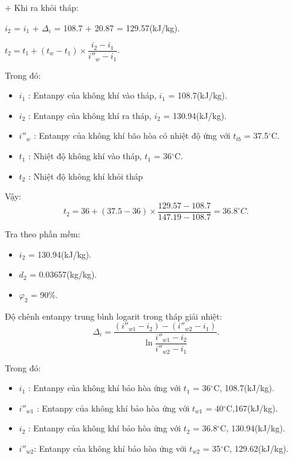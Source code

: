 \newpage
+ Khi ra khỏi tháp:

	$i_{2}$ = $i_{1}$ + $\Delta_{i}$ = 108.7 + 20.87 = 129.57(kJ/kg).
	
	$t_{2} = t_{1} + (t_{w} - t_{1}) \times \dfrac{i_{2} - i_{1}}{i''_{w} - i_{1}}$.
	
Trong đó:
\begin{itemize}
	\item $i_{1}$ : Entanpy của không khí vào tháp, $i_{1}$ = 108.7(kJ/kg).
	\item $i_{2}$ : Entanpy của không khí ra tháp, $i_{2}$ = 130.94(kJ/kg).
	\item $i''_{w}$ : Entanpy của không khí bão hòa có nhiệt độ ứng với $t_{tb}$ = 37.5$^{\circ}$C.
	\item $t_{1}$ : Nhiệt độ không khí vào tháp, $t_{1}$ = 36$^{\circ}$C.
	\item $t_{2}$ : Nhiệt độ không khí khỏi tháp
\end{itemize}
 Vậy:
 \begin{equation*}
 	t_{2} = 36 + (37.5 - 36 ) \times \dfrac{129.57 - 108.7}{147.19 - 108.7} = 36.8^{\circ}C.
 \end{equation*}

Tra theo phần mềm:
\begin{itemize}
	\item $i_{2}$ = 130.94(kJ/kg).
	\item $d_{2}$ = 0.03657(kg/kg).
	\item $\varphi_{2}$ = 90\%.
\end{itemize}

Độ chênh entanpy trung bình logarit trong tháp giải nhiệt:
\begin{equation*}
	\Delta_{i} = \dfrac{(i''_{w1} - i_{2}) - (i''_{w2} - i_{1}) }{\ln \dfrac{i''_{w1} - i_{2}}{i''_{w2} - i_{1}}}.
\end{equation*}

Trong đó:
\begin{itemize}
	\item $i_{1}$ : Entanpy của không khí bảo hòa ứng với $t_{1}$ = 36$^{\circ}$C, 108.7(kJ/kg).
	\item $i''_{w1}$ : Entanpy của không khí bảo hòa ứng với $t_{w1}$ = 40$^{\circ}$C,167(kJ/kg).
	\item $i_{2}$ : Entanpy của không khí bảo hòa ứng với $t_{2}$ = 36.8$^{\circ}$C, 130.94(kJ/kg).
	\item $i''_{w2}$: Entanpy của không khí bảo hòa ứng với $t_{w2}$ = 35$^{\circ}$C, 129.62(kJ/kg).
\end{itemize}

